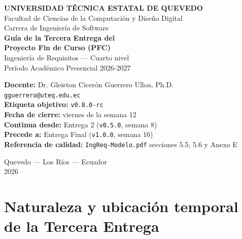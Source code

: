 \documentclass[11pt,a4paper]{article}
\begin{document}
\begin{center}
    \vspace*{1.2cm}
    {\Large\bfseries\textcolor{uteqverde}{UNIVERSIDAD T\'ECNICA ESTATAL DE QUEVEDO}}\\[4pt]
    {\large Facultad de Ciencias de la Computaci\'on y Dise\~no Digital}\\[2pt]
    {\large Carrera de Ingenier\'ia de Software}\\[22pt]

    {\LARGE\bfseries Gu\'ia de la Tercera Entrega del}\\[6pt]
    {\LARGE\bfseries Proyecto Fin de Curso (PFC)}\\[16pt]

    {\large Ingenier\'ia de Requisitos --- Cuarto nivel}\\[2pt]
    {\large Per\'iodo Acad\'emico Presencial 2026-2027}\\[22pt]

    \begin{tcolorbox}[colback=uteqverde!8,colframe=uteqverde,arc=3pt,
                      width=0.88\textwidth,boxrule=0.8pt]
        \centering
        \textbf{Docente:} Dr. Gleiston Cicer\'on Guerrero Ulloa, Ph.D.\\[2pt]
        \texttt{gguerrero@uteq.edu.ec}\\[6pt]
        \textbf{Etiqueta objetivo:} \texttt{v0.8.0-rc}\\[2pt]
        \textbf{Fecha de cierre:} viernes de la semana 12\\[2pt]
        \textbf{Continua desde:} Entrega 2 (\texttt{v0.5.0}, semana 8)\\[2pt]
        \textbf{Precede a:} Entrega Final (\texttt{v1.0.0}, semana 16)\\[2pt]
        \textbf{Referencia de calidad:} \texttt{IngReq-Modelo.pdf} secciones 5.5, 5.6 y Anexo E
    \end{tcolorbox}

    \vfill
    {\small Quevedo --- Los R\'ios --- Ecuador}\\[2pt]
    {\small 2026}
\end{center}

\newpage
\tableofcontents
\newpage

\section{Naturaleza y ubicaci\'on temporal de la Tercera Entrega}
\end{document}
